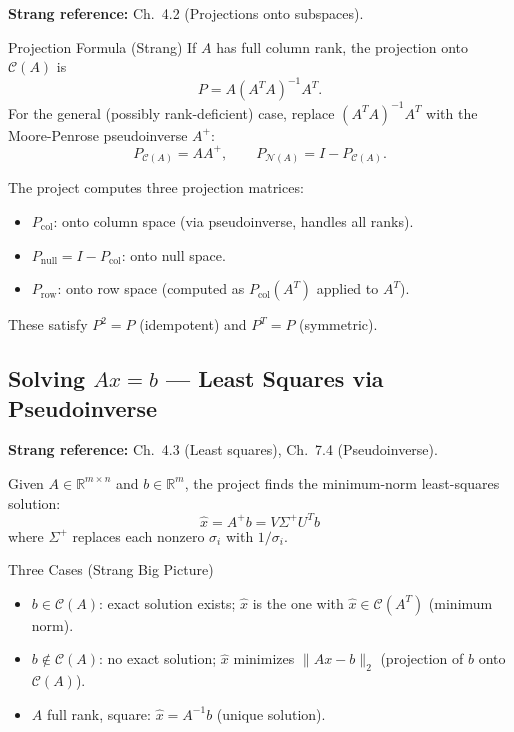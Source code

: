 \documentclass[12pt, a4paper]{article}
\newcommand{\R}{\mathbb{R}}
\newcommand{\Null}{\mathcal{N}}
\newcommand{\Col}{\mathcal{C}}
\newcommand{\Ap}{A^{+}}
\begin{document}
\textbf{Strang reference:} Ch.\ 4.2 (Projections onto subspaces).

\begin{strangbox}{Projection Formula (Strang)}
If $A$ has full column rank, the projection onto $\Col(A)$ is
\[
  P = A(A^T A)^{-1}A^T.
\]
For the general (possibly rank-deficient) case, replace $(A^TA)^{-1}A^T$
with the Moore-Penrose pseudoinverse $\Ap$:
\[
  P_{\Col(A)} = A\Ap, \qquad P_{\Null(A)} = I - P_{\Col(A)}.
\]
\end{strangbox}

\noindent
The project computes three projection matrices:
\begin{itemize}[noitemsep]
  \item $P_{\text{col}}$: onto column space (via pseudoinverse, handles all ranks).
  \item $P_{\text{null}} = I - P_{\text{col}}$: onto null space.
  \item $P_{\text{row}}$: onto row space (computed as $P_{\text{col}}(A^T)$
        applied to $A^T$).
\end{itemize}
These satisfy $P^2 = P$ (idempotent) and $P^T = P$ (symmetric).

\subsection{Solving $Ax = b$ — Least Squares via Pseudoinverse}

\textbf{Strang reference:} Ch.\ 4.3 (Least squares), Ch.\ 7.4 (Pseudoinverse).

Given $A \in \R^{m \times n}$ and $b \in \R^m$, the project finds the
minimum-norm least-squares solution:
\[
  \hat{x} = \Ap b = V\Sigma^+U^T b
\]
where $\Sigma^+$ replaces each nonzero $\sigma_i$ with $1/\sigma_i$.

\begin{strangbox}{Three Cases (Strang Big Picture)}
\begin{itemize}[noitemsep]
  \item $b \in \Col(A)$: exact solution exists; $\hat{x}$ is the one
        with $\hat{x} \in \Col(A^T)$ (minimum norm).
  \item $b \notin \Col(A)$: no exact solution; $\hat{x}$ minimizes
        $\|Ax - b\|_2$ (projection of $b$ onto $\Col(A)$).
  \item $A$ full rank, square: $\hat{x} = A^{-1}b$ (unique solution).
\end{itemize}
\end{strangbox}
\end{document}
